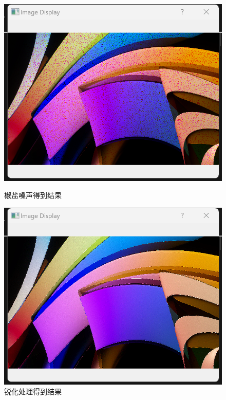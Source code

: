 \documentclass[a4paper,12pt]{article}
\begin{document}
\begin{figure}[htbp]
    \vspace{0.2cm}
    
    \begin{minipage}[b]{0.48\textwidth}
        \centering
        \includegraphics[width=\linewidth]{images/Design/image_processing/2/pepper_noise.png}
        \caption{椒盐噪声得到结果}
    \end{minipage}
    \hfill
    \begin{minipage}[b]{0.48\textwidth}
        \centering
        \includegraphics[width=\linewidth]{images/Design/image_processing/2/sharpen.png}
        \caption{锐化处理得到结果}
    \end{minipage}


\end{figure}
\end{document}
